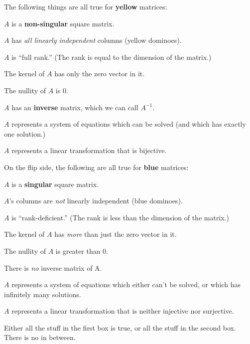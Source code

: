 \pagebreak
The following things are all true for \textbf{yellow} matrices:


\begin{framed}
\begin{compactitem}
\item $A$ is a \textbf{non-singular} square matrix.
\item $A$ has \textit{all linearly independent} columns (yellow dominoes).
\item $A$ is ``full rank.'' (The rank is equal to the dimension of the matrix.)
\item The kernel of $A$ has only the zero vector in it.
\item The nullity of $A$ is 0.
\item $A$ has an \textbf{inverse} matrix, which we can call $A^{-1}$.
\item $A$ represents a system of equations which can be solved (and which has
exactly one solution.)
\item $A$ represents a linear transformation that is bijective.
\end{compactitem}
\end{framed}


On the flip side, the following are all true for \textbf{blue} matrices:

\begin{framed}
\begin{compactitem}
\item $A$ is a \textbf{singular} square matrix.
\item $A$'s columns are \textit{not} linearly independent (blue dominoes).
\item $A$ is ``rank-deficient.'' (The rank is less than the dimension of the
matrix.)
\item The kernel of $A$ has \textit{more} than just the zero vector in it.
\item The nullity of $A$ is greater than 0.
\item There is \textit{no} inverse matrix of A.
\item $A$ represents a system of equations which either can't be solved, or
which has infinitely many solutions.
\item $A$ represents a linear transformation that is neither injective nor
surjective.
\end{compactitem}
\end{framed}

Either all the stuff in the first box is true, or all the stuff in the second
box. There is no in between.
